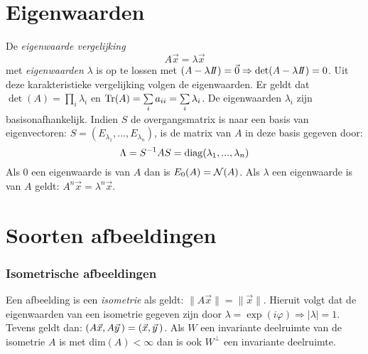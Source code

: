 \section{Eigenwaarden}
De {\it eigenwaarde vergelijking}
\[
A\vec{x}=\lambda\vec{x}
\]
met {\it eigenwaarden} $\lambda$ is op te lossen met
$(A-\lambda I\hspace{-1mm}I)=\vec{0}\Rightarrow\det(A-\lambda I\hspace{-1mm}I)=0$. Uit deze
karakteristieke vergelijking volgen de eigenwaarden. Er geldt dat
$\det(A)=\prod\limits_i\lambda_i$ en
${\rm Tr}(A)=\sum\limits_ia_{ii}=\sum\limits_i\lambda_i$.
\npar
De eigenwaarden $\lambda_i$ zijn basisonafhankelijk. Indien $S$ de overgangsmatrix
is naar een basis van eigenvectoren: $S=(E_{\lambda_1},...,E_{\lambda_n})$, is
de matrix van $A$ in deze basis gegeven door:
\[
\Lambda=S^{-1}AS={\rm diag}(\lambda_1,...,\lambda_n)
\]
Als 0 een eigenwaarde is van $A$ dan is $E_0(A)={\cal N}(A)$.
\npar
Als $\lambda$ een eigenwaarde is van $A$ geldt: $A^n\vec{x}=\lambda^n\vec{x}$.

\section{Soorten afbeeldingen}
\subsubsection{Isometrische afbeeldingen}
Een afbeelding is een {\it isometrie} als geldt: $\|A\vec{x}\|=\|\vec{x}\|$.
Hieruit volgt dat de eigenwaarden van een isometrie gegeven zijn door
$\lambda=\exp(i\varphi)\Rightarrow|\lambda|=1$. Tevens geldt dan:
$(A\vec{x},A\vec{y}\,)=(\vec{x},\vec{y}\,)$.
\npar
Als $W$ een invariante deelruimte van de isometrie $A$ is met dim$(A)<\infty$
dan is ook $W^\perp$ een invariante deelruimte.

